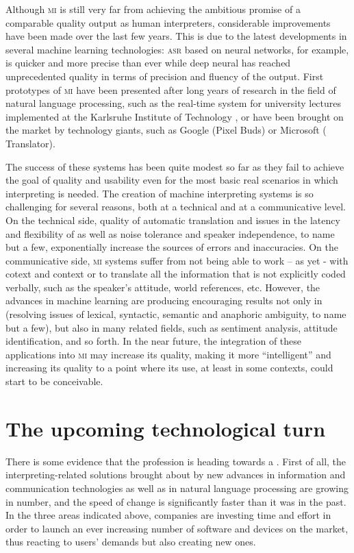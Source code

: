 \documentclass[output=paper]{langsci/langscibook}
\begin{document}
Although \textsc{mi} is still very far from achieving  the ambitious promise of a comparable quality output as human interpreters, considerable improvements have been made over the last few years. This is due to the latest developments in several machine learning technologies: \textsc{asr} based on neural networks, for example, is quicker and more precise than ever while deep neural  has reached unprecedented quality in terms of precision and fluency of the  output. First prototypes of \textsc{mi} have been presented after long years of research in the field of natural language processing, such as the real-time  system for university lectures implemented at the Karlsruhe Institute of Technology \citep{muller_lecture_2016}, or have been brought on the market by technology giants, such as Google (Pixel Buds) or Microsoft ( Translator).  
 
The success of these systems has been quite modest so far as they fail to achieve the goal of quality and usability even for the most basic real scenarios in which interpreting is needed. The creation of machine interpreting systems is so challenging for several reasons, both at a technical and at a communicative level. On the technical side, quality of automatic translation and issues in the latency and flexibility of  as well as noise tolerance and speaker independence, to name but a few, exponentially increase the sources of errors and inaccuracies. On the communicative side, \textsc{mi} systems suffer from not being able to work – as yet - with cotext and context or to translate all the information that is not explicitly coded verbally, such as the speaker's attitude, world references, etc. However, the advances in machine learning are producing encouraging results not only in  (resolving issues of lexical, syntactic, semantic and anaphoric ambiguity, to name but a few), but also in many related fields, such as sentiment analysis, attitude identification, and so forth. In the near future, the integration of these applications into \textsc{mi} may increase its quality, making it more ``intelligent'' and increasing its quality to a point where its use, at least in some contexts, could start to be conceivable.
 
\section{The upcoming technological turn} 
There is some evidence that the profession is heading towards a . First of all, the interpreting-related solutions brought about by new advances in information and communication technologies as well as in natural language processing are growing in number, and the speed of change is significantly faster than it was in the past. In the three areas indicated above, companies are investing time and effort in order to launch an ever increasing number of software and devices on the market, thus reacting to users’ demands but also creating new ones.
 
\end{document}
